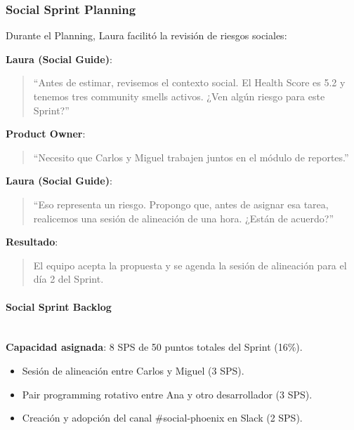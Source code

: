 \subsubsection{Social Sprint Planning}

Durante el Planning, Laura facilitó la revisión de riesgos sociales:

\begin{escenario}

    \textbf{Laura (Social Guide)}:
    \begin{quote}
        “Antes de estimar, revisemos el contexto social.
        El Health Score es 5.2 y tenemos tres community smells activos.
        ¿Ven algún riesgo para este Sprint?”
    \end{quote}

    \textbf{Product Owner}:
    \begin{quote}
        “Necesito que Carlos y Miguel trabajen juntos en el módulo de reportes.”
    \end{quote}

    \textbf{Laura (Social Guide)}:
    \begin{quote}
        “Eso representa un riesgo. Propongo que, antes de asignar esa tarea,
        realicemos una sesión de alineación de una hora.
        ¿Están de acuerdo?”
    \end{quote}

    \textbf{Resultado}:
    \begin{quote}
        El equipo acepta la propuesta y se agenda la sesión de alineación para el día 2 del Sprint.
    \end{quote}

\end{escenario}


\paragraph{Social Sprint Backlog}\mbox{}\\[-0.3\baselineskip]

\textbf{Capacidad asignada}: 8 SPS de 50 puntos totales del Sprint (16\%).

\begin{itemize}
    \item Sesión de alineación entre Carlos y Miguel (3 SPS).
    \item Pair programming rotativo entre Ana y otro desarrollador (3 SPS).
    \item Creación y adopción del canal \#social-phoenix en Slack (2 SPS).
\end{itemize}

